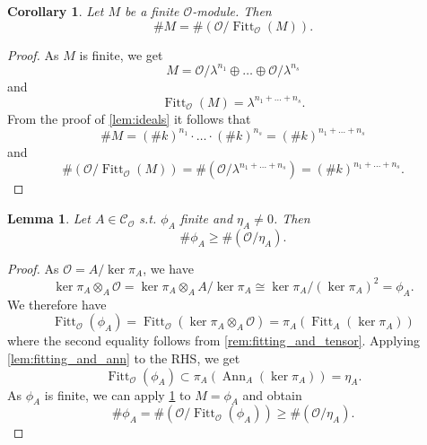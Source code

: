 \documentclass{article}
\theoremstyle{plain}%
\newtheorem{lemma}[theorem]{Lemma}
\newtheorem{corollary}[theorem]{Corollary}
\theoremstyle{definition}
\theoremstyle{remark}
\newcommand{\co}{\mathcal{C}_\mathcal{O}}
\newcommand{\ann}{\operatorname{Ann}}
\newcommand{\fitt}{\operatorname{Fitt}}
\begin{document}
\begin{corollary}\label{cor:fitting_finite}
    Let \(M\) be a finite \(\mathcal{O}\)-module. Then
    \[
        \# M = \# (\mathcal{O}/\fitt_\mathcal{O}(M)). 
    \]
\end{corollary}
\begin{proof}
    As \(M\) is finite, we get
    \[
        M = \mathcal{O}/\lambda^{n_1} \oplus \dots \oplus \mathcal{O}/\lambda^{n_s}
    \]
    and 
    \[
        \fitt_\mathcal{O}(M) = \lambda^{n_1 + \dots + n_s}.
    \]
    From the proof of \cref{lem:ideals} it follows that
    \[\# M = (\# k)^{n_1} \cdot \dots \cdot (\# k)^{n_s} = (\# k)^{n_1 + \dots + n_s}\]
    and
    \[
        \# (\mathcal{O}/\fitt_\mathcal{O}(M)) = \# (\mathcal{O}/\lambda^{n_1 + \dots + n_s}) = (\# k)^{n_1 + \dots + n_s}.
    \]
\end{proof}

\begin{lemma}\label{lem:standard_ineq}
    Let \(A \in \co\) s.t. \(\phi_A\) finite and \(\eta_A \neq 0\). Then \[\#\phi_A \geq \#(\mathcal{O}/\eta_A).\]
\end{lemma}
\begin{proof}
    As \(\mathcal{O} = A/\ker \pi_A\), we have
    \[
        \ker \pi_A \otimes_A \mathcal{O} = \ker \pi_A \otimes_A A/\ker \pi_A \cong \ker \pi_A/(\ker \pi_A)^2 = \phi_A.
    \]
    We therefore have
    \[
        \fitt_\mathcal{O}(\phi_A) = \fitt_\mathcal{O}(\ker \pi_A \otimes_A\mathcal{O}) = \pi_A(\fitt_A(\ker \pi_A))
    \]
    where the second equality follows from \cref{rem:fitting_and_tensor}.
    Applying \cref{lem:fitting_and_ann} to the RHS, we get 
    \[
        \fitt_\mathcal{O}(\phi_A) \subset \pi_A(\ann_A(\ker \pi_A)) = \eta_A.
    \]
    As \(\phi_A\) is finite, we can apply \cref{cor:fitting_finite} to \(M = \phi_A\) and obtain
    \[
        \# \phi_A = \# (\mathcal{O}/\fitt_\mathcal{O}(\phi_A)) \geq \# (\mathcal{O}/\eta_A).
    \]
\end{proof}
\end{document}
